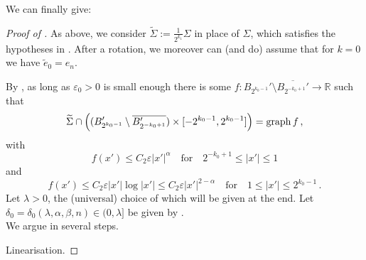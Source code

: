 \documentclass{article}
\newcommand{\R}{\mathbb{R}}
\newcommand{\ep}{\varepsilon}
\theoremstyle{definition}
\begin{document}
We can finally give:
\begin{proof}[Proof of ]
As above, we consider $\widetilde \Sigma:=\frac{1}{2^{k_1}}\Sigma$ in place of $\Sigma$, which satisfies the hypotheses in . After a rotation, we moreover can (and do) assume that for $k=0$ we have $\widetilde e_{0}=e_n$.

By , as long as $\ep_0>0$ is small enough there is some $f:B_{2^{k_0-1}}'\setminus \overline{B_{2^{-k_0+1}}'}\to\R$ such that
    \begin{equation}\label{eq:894tibhabHyp2}
        \widetilde \Sigma\cap \left((B_{2^{k_0-1}}'\setminus \overline{B_{2^{-k_0+1}}'})\times [-2^{k_0-1},2^{k_0-1}]\right)={\rm graph}\, f\,,
    \end{equation}
with
\begin{equation}\label{eq:89ygqiubrgipab}
    f(x')\leq C_2\ep|x'|^{\alpha}\quad\mbox{for}\quad 2^{-k_0+1}\leq|x'|\leq 1
\end{equation}
and
\begin{equation}\label{eq:89ygqiubrgipab2}
    f(x')\leq C_2\ep|x'|\log |x'|\leq C_2\ep|x'|^{2-\alpha}\quad\mbox{for}\quad 1\leq|x'|\leq 2^{k_0-1}\,.
\end{equation}
Let $\lambda>0$, the (universal) choice of which will be given at the end. Let $\delta_0=\delta_0(\lambda,\alpha,\beta,n)\in(0,\lambda]$ be given by .\\
We argue in several steps.

 Linearisation.


\end{proof}
\end{document}
